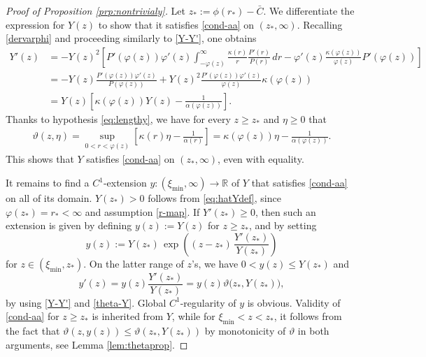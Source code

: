 \documentclass[reqno]{amsart}
\newcommand{\R}{\mathbb{R}}
\begin{document}
%
\begin{proof}[Proof of Proposition \ref{prp:nontrivialy}]
    Let $z_*:=\phi(r_*)-\bar C$. We differentiate the expression for $Y(z)$ to show that it satisfies \eqref{cond-aa} on $(z_*,\infty)$. Recalling \eqref{dervarphi} and proceeding similarly to \eqref{Y-Y'}, one obtains 
    \begin{align}\label{Y-Y'}
        Y'(z) 
        &= -Y(z)^2\left[P'(\varphi(z))\varphi'(z)\int_{-\varphi(z)}^\infty\frac{\kappa(r)}r\frac{P'(r)}{P(r)}\,dr -\varphi'(z)\frac{\kappa(\varphi(z))}{\varphi(z)}{P'(\varphi(z))}\right] \nonumber \\
        &= -Y(z)\frac{P'(\varphi(z))\varphi'(z)}{P(\varphi(z))} + Y(z)^2\frac{P'(\varphi(z))\varphi'(z)}{\varphi(z)}\kappa(\varphi(z)) \\
        &= Y(z)\left[\kappa(\varphi(z))Y(z)-\frac1{\alpha(\varphi(z))}\right]. \nonumber 
    \end{align}
    Thanks to hypothesis \eqref{eq:lengthy}, we have for every $z\ge z_*$ and $\eta\ge0$ that
    \begin{align}\label{theta-Y}
        \vartheta(z,\eta) = \sup_{0<r<\varphi(z)} \left[\kappa(r)\eta-\frac1{\alpha(r)}\right]
        = \kappa(\varphi(z))\eta-\frac1{\alpha(\varphi(z))}. 
    \end{align}
    This shows that $Y$ satisfies \eqref{cond-aa} on $(z_*,\infty)$, even with equality. 
    
    It remains to find a $C^1$-extension $y:(\xi_\text{min},\infty)\to\R$ of $Y$ that satisfies \eqref{cond-aa} on all of its domain. 
    $Y(z_*)>0$ follows from \eqref{eq:hatYdef}, since $\varphi(z_*)=r_*<\infty$ and assumption \eqref{r-map}. 
    If $Y'(z_*)\ge0$, then such an extension is given by defining $y(z):=Y(z)$ for $z\ge z_*$, and by setting 
    \[ y(z) := Y(z_*)\,\exp\left((z-z_*)\,\frac{Y'(z_*)}{Y(z_*)}\right) \]
    for $z\in(\xi_\text{min},z_*)$. On the latter range of $z$'s, we have $0<y(z)\le Y(z_*)$ and
    \[ y'(z) = y(z)\frac{Y'(z_*)}{Y(z_*)} = y(z)\vartheta\big(z_*,Y(z_*)\big), \]
    by using \eqref{Y-Y'} and \eqref{theta-Y}.
    Global $C^1$-regularity of $y$ is obvious. Validity of \eqref{cond-aa} for $z\ge z_*$ is inherited from $Y$, while for $\xi_\text{min}<z<z_*$, it follows from the fact that $\vartheta(z,y(z))\le\vartheta(z_*,Y(z_*))$ by monotonicity of $\vartheta$ in both arguments, see Lemma \ref{lem:thetaprop}. 


\end{proof}
\end{document}
